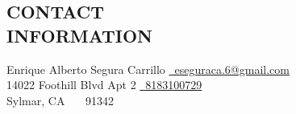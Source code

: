 \documentclass[margin,line]{res}
\begin{document}
\nocite{*}


\begin{resume}

\section{ CONTACT \\ INFORMATION}

Enrique Alberto Segura Carrillo                \hfill \href{mailto:eseguraca.6@gmail.com}{~eseguraca.6@gmail.com}
\vspace{0mm}\\\vspace{0mm}%
14022 Foothill Blvd Apt 2  \hfill \href{tel:818-310-0729}{~8183100729}
\vspace{0mm}\\\vspace{0mm}%
Sylmar, CA \ \ \ 91342\hfill %



%


\end{resume}
\end{document}
